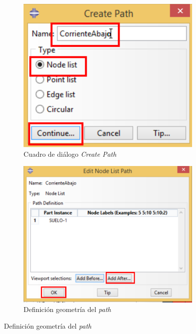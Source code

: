 \begin{itemize}
\begin{figure}[!h]
\begin{subfigure}[!h]{0.40\textwidth}
      \includegraphics[width=\textwidth]{./body/images/post07.pdf}
      \caption{Cuadro de diálogo \textit{Create Path}}
      \label{post07}
    \end{subfigure}%
    \begin{subfigure}[!h]{0.40\textwidth}
      \includegraphics[width=\textwidth]{./body/images/post08.pdf}
      \caption{Definición geometría del \textit{path}}
      \label{post08}
    \end{subfigure}%
    

\end{figure}
\end{itemize}
